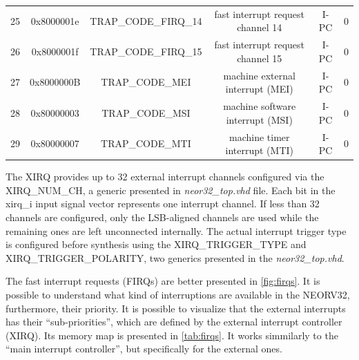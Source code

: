\begin{table}[H]
{\begin{tabular}{@{} cccccc}
                    25 & 0x8000001e & TRAP\_CODE\_FIRQ\_14 & fast interrupt request channel 14 & I-PC & 0 \\ 
                    26 & 0x8000001f & TRAP\_CODE\_FIRQ\_15 & fast interrupt request channel 15 & I-PC & 0 \\ 
                    27 & 0x8000000B & TRAP\_CODE\_MEI & machine external interrupt (MEI) & I-PC & 0 \\ 
                    28 & 0x80000003 & TRAP\_CODE\_MSI & machine software interrupt (MSI) & I-PC & 0 \\ 
                    29 & 0x80000007 & TRAP\_CODE\_MTI & machine timer interrupt (MTI) & I-PC & 0 \\ 
                    \bottomrule
                \end{tabular}
            }
            \label{tab:interrupt_definitions}
        \end{table}

            \begin{tcolorbox}[colback=blue!5!white,colframe=blue!75!black,title=Extra information]
                The XIRQ provides up to 32 external interrupt channels configured via the XIRQ\_NUM\_CH, a generic presented in \textit{neor32\_top.vhd} file. Each bit in the xirq\_i input signal vector represents one interrupt channel. If less than 32 channels are configured, only the LSB-aligned channels are used while the remaining ones are left unconnected internally. The actual interrupt trigger type is configured before synthesis using the XIRQ\_TRIGGER\_TYPE and XIRQ\_TRIGGER\_POLARITY, two generics presented in the \textit{neor32\_top.vhd}.
            \end{tcolorbox}
    
            The fast interrupt requests (FIRQs) are better presented in \autoref{fig:firqs}. It is possible to understand what kind of interruptions are available in the NEORV32, furthermore, their priority. It is possible to visualize that the external interrupts has their ``sub-priorities'', which are defined by the external interrupt controller (XIRQ). Its memory map is presented in \autoref{tab:firqs}. It works simmilarly to the ``main interrupt controller'', but specifically for the external ones. 

